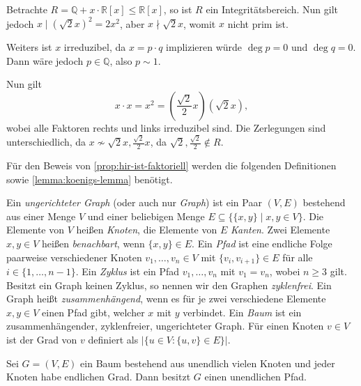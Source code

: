 \begin{example}
    Betrachte $R = \mathbb{Q} + x \cdot \mathbb{R}[x] \leq \mathbb{R}[x]$, so ist $R$ ein Integritätsbereich. Nun gilt jedoch $x \mid (\sqrt{2} x)^2 = 2x^2$, aber $x \nmid \sqrt{2}x$, womit $x$ nicht prim ist.
    
    Weiters ist $x$ irreduzibel, da $x = p \cdot q$ implizieren würde $\deg{p} = 0$ und $\deg{q} = 0$. Dann wäre jedoch $p \in \mathbb{Q}$, also $p \sim 1$.
    
    Nun gilt
    $$ x \cdot x = x^2 = \left(\frac{\sqrt{2}}{2} x\right)(\sqrt{2}x), $$
    wobei alle Faktoren rechts und links irreduzibel sind. Die Zerlegungen sind unterschiedlich, da $x \not\sim \sqrt{2} x, \frac{\sqrt{2}}{2} x$, da $\sqrt{2}, \frac{\sqrt{2}}{2} \notin R$.
\end{example}

Für den Beweis von \cref{prop:hir-ist-faktoriell} werden die folgenden Definitionen sowie \cref{lemma:koenigs-lemma} benötigt.


\begin{definition}
    Ein \emph{ungerichteter Graph} (oder auch nur \emph{Graph}) ist ein Paar $(V,E)$ bestehend aus einer Menge $V$ und einer beliebigen Menge $E\subseteq\{\{x,y\}\mid x,y\in V\}$. Die Elemente von $V$ heißen \emph{Knoten}, die Elemente von $E$ \emph{Kanten}. Zwei Elemente $x,y\in V$ heißen \emph{benachbart}, wenn $\{x,y\}\in E$. Ein \emph{Pfad} ist eine endliche Folge paarweise verschiedener Knoten $v_1,\ldots,v_n\in V$ mit $\{v_i,v_{i+1}\}\in E$ für alle $i\in\{1,\ldots,n-1\}$.
    Ein \emph{Zyklus} ist ein Pfad $v_1,\ldots,v_n$ mit $v_1=v_n$, wobei $n\geq 3$ gilt. Besitzt ein Graph keinen Zyklus, so nennen wir den Graphen \emph{zyklenfrei}. Ein Graph heißt \emph{zusammenhängend}, wenn es für je zwei verschiedene Elemente $x,y\in V$ einen Pfad gibt, welcher $x$ mit $y$ verbindet. Ein \emph{Baum} ist ein zusammenhängender, zyklenfreier, ungerichteter Graph. Für einen Knoten $v\in V$ ist der Grad von $v$ definiert als $|\{u\in V:\{u,v\}\in E\}|$.
\end{definition}

\begin{lemma}  \label{lemma:koenigs-lemma}
    Sei $G=(V,E)$ ein Baum bestehend aus unendlich vielen Knoten und jeder Knoten habe endlichen Grad. Dann besitzt $G$ einen unendlichen Pfad.
\end{lemma}

